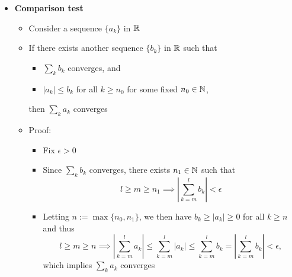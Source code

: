 \documentclass[12pt,a4paper]{article}
\begin{document}
\begin{itemize}

\item \textbf{Comparison test}
  \begin{itemize}
  \item Consider a sequence $\{a_{k}\}$ in $\mathbb{R}$
  \item If there exists another sequence $\{b_{k}\}$ in $\mathbb{R}$ such that
    \begin{itemize}
    \item $\sum_{k}b_{k}$ converges, and
    \item $|a_{k}|\leq b_{k}$ for all $k\geq n_{0}$ for some fixed $n_{0}\in \mathbb{N}$,
    \end{itemize}
    then $\sum_{k}a_{k}$ converges
  \item Proof:
    \begin{itemize}
    \item Fix $\epsilon > 0$
    \item Since $\sum_{k}b_{k}$ converges, there exists $n_{1}\in \mathbb{N}$ such that
      \begin{equation}\nonumber%
        l\geq m\geq n_{1}  \implies \left| \sum_{k=m}^{l}b_{k}\right|< \epsilon
      \end{equation}
    \item Letting $n:=\max\{n_{0}, n_{1}\}$,
      we then have $b_{k} \geq |a_{k}|\geq 0$ for all $k\geq n$ and thus
      \begin{equation}\nonumber%
        l\geq m\geq n  \implies
        \left| \sum_{k=m}^{l}a_{k}\right|
        \leq
        \sum_{k=m}^{l}\left|a_{k}\right|
        \leq
        \sum_{k=m}^{l}b_{k}
        =
        \left| \sum_{k=m}^{l}b_{k}\right|< \epsilon,
      \end{equation}
      which implies $\sum_{k}a_{k}$ converges
    \end{itemize}
  \end{itemize}


\end{itemize}
\end{document}
